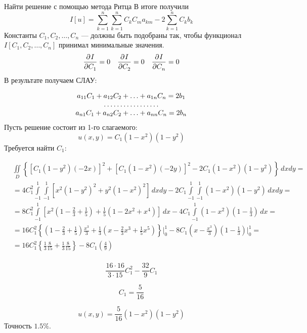 \begin{example}{Найти решение с помощью метода Ритца}
В итоге получили
\[
	I[u] =  \sum_{k = 1}^n \sum_{k = 1}^n C_k C_m a_{km} - 2 \sum\limits_{k = 1}^n C_k b_k
\]
Константы $C_1, C_2, \ldots, C_n$ --- должны быть подобраны так, чтобы функционал $I [C_1, C_2, \ldots, C_n]$ принимал минимальные значения.
\[
	\frac{\partial^{}I}{\partial C_1^{}} = 0 \quad \frac{\partial^{}I}{\partial C_2^{}} = 0 \quad \frac{\partial^{}I}{\partial C_n^{}} = 0
\]
В результате получаем СЛАУ:

\[
	\begin{matrix}
	   a_{11} C_1 + a_{12} C_2 +\ldots +a_{1n}C_n = 2 b_1\\
	   \hdotsfor{1}\\
	   a_{n1} C_1 +a_{n2} C_2+ \ldots+ a_{nn}C_n = 2 b_n
	\end{matrix}
\]
Пусть решение состоит из 1-го слагаемого:
\[
	u(x, y) = C_1 (1 - x^2)(1 - y^2)
\]
Требуется найти $C_1$:

\begin{align*}
	&\iint\limits_D \left\{ \left[C_1 (1 - y^2)(- 2 x) \right]^2 + \left[C_1 (1 - x^2)(-2y) \right]^2 - 2 C_1 (1 - x^2)(1 - y^2) \right\}\, dx dy =\\
	&=4 C_1^2  \int\limits_{-1}^1 \int\limits_{-1}^1 \left[ x^2 (1 - y^2)^2 + y^2 (1- x^2)^2 \right]\, dx dy  - 2 C_1 \int\limits_{-1}^1 \int\limits_{-1}^1 (1 - x^2)(1 - y^2)\, dx dy =\\
	&=8 C_1^2 \int\limits_{-1}^1 \left[x^2 \left(1 - \frac{2}{3} + \frac{1}{5} \right) + \frac{1}{5} \left(1 - 2 x^2 + x^4 \right)\right]\, dx - 4 C_1 \int\limits_{-1}^1  (1 - x^2) \left(1 - \frac{1}{3}\right) \, dx =\\
	&=16 C_1^2 \left\{ \left(1 - \frac{2}{3} + \frac{1}{5} \right) \frac{x^3}{3} + \frac{1}{3} \left(x - \frac{2}{3} x^3 + \frac{1}{5} x^5 \right)\right\} \Bigg|_0^1 - 8 C_1 \left(x - \frac{x^3}{3} \right) \left(1 - \frac{1}{3}\right)\Bigg|_0^1 =\\
	&=16 C_1^2 \left\{\frac{1}{3} \frac{8}{15} + \frac{1}{3} \frac{8}{15} \right\} - 8 C_1 \left(\frac{4}{9} \right)\\
\end{align*}

\[
	\frac{16 \cdot 16}{3 \cdot 15} C_1^2 - \frac{32}{9} C_1
\]

\[
	C_1 = \frac{5}{16}
\]

\[
	u(x,y) = \frac{5}{16} (1 - x^2)(1 - y^2)
\]
Точность $1.5\%$.
\end{example}
